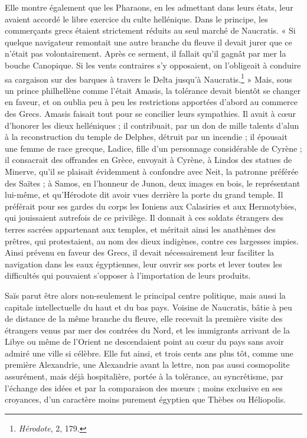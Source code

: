 \documentclass[letterpaper,twocolumn,openany,nodeprecatedcode]{dndbook}
\begin{document}
Elle montre également que les Pharaons, en les admettant dans leurs états, leur avaient accordé le libre exercice du culte hellénique. Dans le principe, les commerçants grecs étaient strictement réduits au seul marché de Naucratis. « Si quelque navigateur remontait une autre branche du fleuve il devait jurer que ce n'était pas volontairement. Après ce serment, il fallait qu'il gagnât par mer la bouche Canopique. Si les vents contraires s'y opposaient, on l'obligeait à conduire sa cargaison sur des barques à travers le Delta jusqu'à Naucratis.\footnote{\emph{Hérodote}, 2, 179.} » Mais, sous un prince philhellène comme l'était Amasis, la tolérance devait bientôt se changer en faveur, et on oublia peu à peu les restrictions apportées d'abord au commerce des Grecs. Amasis faisait tout pour se concilier leurs sympathies. Il avait à cœur d'honorer les dieux helléniques ; il contribuait, par un don de mille talents d'alun à la reconstruction du temple de Delphes, détruit par un incendie ; il épousait une femme de race grecque, Ladice, fille d'un personnage considérable de Cyrène ; il consacrait des offrandes en Grèce, envoyait à Cyrène, à Lindos des statues de Minerve, qu'il se plaisait évidemment à confondre avec Neit, la patronne préférée des Saïtes ; à Samos, en l'honneur de Junon, deux images en bois, le représentant lui-même, et qu'Hérodote dit avoir vues derrière la porte du grand temple. Il préférait pour ses gardes du corps les Ioniens aux Calasiries et aux Hermotybies, qui jouissaient autrefois de ce privilège. Il donnait à ces soldats étrangers des terres sacrées appartenant aux temples, et méritait ainsi les anathèmes des prêtres, qui protestaient, au nom des dieux indigènes, contre ces largesses impies. Ainsi prévenu en faveur des Grecs, il devait nécessairement leur faciliter la navigation dans les eaux égyptiennes, leur ouvrir ses ports et lever toutes les difficultés qui pouvaient s'opposer à l'importation de leurs produits.

Saïs parut être alors non-seulement le principal centre politique, mais aussi la capitale intellectuelle du haut et du bas pays. Voisine de Naucratis, bâtie à peu de distance de la même branche du fleuve, elle recevait la première visite des étrangers venus par mer des contrées du Nord, et les immigrants arrivant de la Libye ou même de l'Orient ne descendaient point au cœur du pays sans avoir admiré une ville si célèbre. Elle fut ainsi, et trois cents ans plus tôt, comme une première Alexandrie, une Alexandrie avant la lettre, non pas aussi cosmopolite assurément, mais déjà hospitalière, portée à la tolérance, au syncrétisme, par l'échange des idées et par la comparaison des mœurs ; moins exclusive en ses croyances, d'un caractère moins purement égyptien que Thèbes ou Héliopolis.
\end{document}
